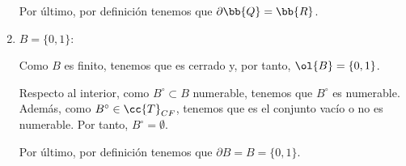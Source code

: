 \begin{ejercicio}
\begin{enumerate}
            Por último, por definición tenemos que $\partial \bb{Q}=\bb{R}$.
        
        \item $B=\{0,1\}$:

            Como $B$ es finito, tenemos que es cerrado y, por tanto, $\ol{B}=\{0,1\}$.

            Respecto al interior, como $B^\circ \subset B$ numerable, tenemos que $B^\circ$ es numerable. Además, como $B^\circ \in \cc{T}_{CF}$, tenemos que es el conjunto vacío o no es numerable. Por tanto, $B^\circ = \emptyset$.

            
            Por último, por definición tenemos que $\partial B=B=\{0,1\}$.
    \end{enumerate}
\end{ejercicio}


